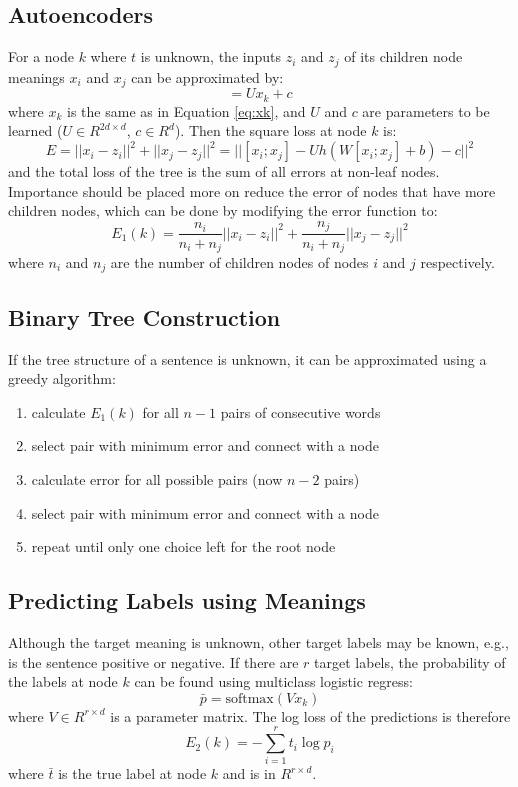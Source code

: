 \documentclass{article}
\begin{document}
%
%
\subsection{Autoencoders}
For a node $k$ where $t$ is unknown, the inputs $z_i$ and $z_j$ of its children node meanings $x_i$ and $x_j$ can be approximated by:
\begin{equation}
    [z_i ; z_j] = U x_k + c
\end{equation}
where $x_k$ is the same as in Equation \ref{eq:xk}, and $U$ and $c$ are parameters to be learned ($U \in R^{2d \times d}$, $c \in R^d$). Then the square loss at node $k$ is:
\begin{equation}
    E = ||x_i - z_i||^2 + ||x_j - z_j||^2 = || [x_i;x_j] - U h(W[x_i; x_j] + b) - c||^2
\end{equation}
and the total loss of the tree is the sum of all errors at non-leaf nodes. Importance should be placed more on reduce the error of nodes that have more children nodes, which can be done by modifying the error function to:
\begin{equation}
    E_1 (k) = \frac{n_i}{n_i + n_j} ||x_i - z_i||^2 + \frac{n_j}{n_i + n_j} ||x_j - z_j||^2
\end{equation}
where $n_i$ and $n_j$ are the number of children nodes of nodes $i$ and $j$ respectively.


%
%
\subsection{Binary Tree Construction}
If the tree structure of a sentence is unknown, it can be approximated using a greedy algorithm:
\begin{enumerate}
    \item calculate $E_1(k)$ for all $n - 1$ pairs of consecutive words
    \item select pair with minimum error and connect with a node
    \item calculate error for all possible pairs (now $n-2$ pairs)
    \item select pair with minimum error and connect with a node
    \item repeat until only one choice left for the root node
\end{enumerate}


%
%
\subsection{Predicting Labels using Meanings}
Although the target meaning is unknown, other target labels may be known, e.g., is the sentence positive or negative. If there are $r$ target labels, the probability of the labels at node $k$ can be found using multiclass logistic regress:
\begin{equation}
    \bar{p} = \textrm{softmax}(V x_k)
\end{equation}
where $V \in R^{r \times d}$ is a parameter matrix. The log loss of the predictions is therefore
\begin{equation}
    E_2 (k) = - \sum_{i=1}^r t_i \log p_i
\end{equation}
where $\bar{t}$ is the true label at node $k$ and is in $R^{r \times d}$.
\end{document}
